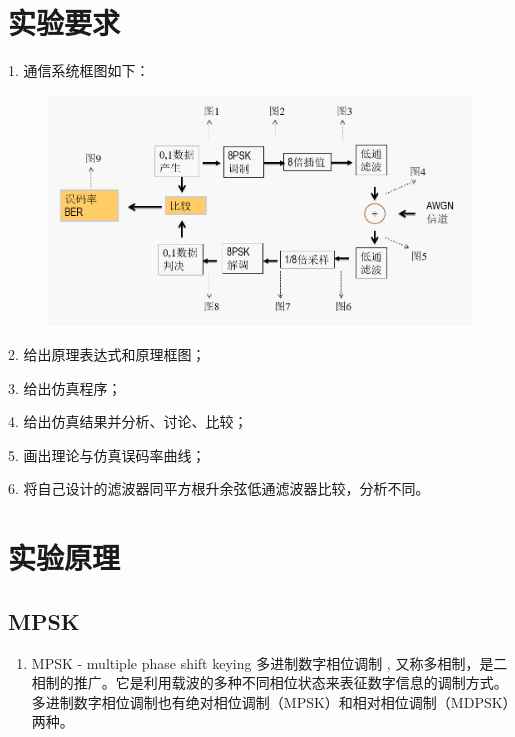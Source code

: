 \begin{spacing}{1.5}
\maketitle
\tableofcontents
\thispagestyle{empty}
\restoregeometry
\newpage

\section{实验要求}

1. 通信系统框图如下：

\begin{figure}[H]
\centering
\includegraphics[width = \columnwidth]{blockdiagram.png}
\end{figure}

2. 给出原理表达式和原理框图；

3. 给出仿真程序；

4. 给出仿真结果并分析、讨论、比较；

5. 画出理论与仿真误码率曲线；

6. 将自己设计的滤波器同平方根升余弦低通滤波器比较，分析不同。


\section{实验原理}

\subsection{MPSK}
\begin{enumerate}

\item MPSK - multiple phase shift keying 多进制数字相位调制 , 又称多相制，是二相制的推广。它是利用载波的多种不同相位状态来表征数字信息的调制方式。多进制数字相位调制也有绝对相位调制（MPSK）和相对相位调制（MDPSK）两种。


\end{enumerate}
\end{spacing}
